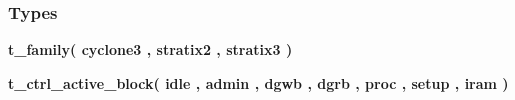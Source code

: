 \subsubsection*{Types}
 \begin{DoxyCompactItemize}
\item 
{\bfseries {\bf t\+\_\+family}{\bfseries \textcolor{vhdlchar}{(}\textcolor{vhdlchar}{ }\textcolor{vhdlchar}{cyclone3}\textcolor{vhdlchar}{ }\textcolor{vhdlchar}{,}\textcolor{vhdlchar}{ }\textcolor{vhdlchar}{stratix2}\textcolor{vhdlchar}{ }\textcolor{vhdlchar}{,}\textcolor{vhdlchar}{ }\textcolor{vhdlchar}{stratix3}\textcolor{vhdlchar}{ }\textcolor{vhdlchar}{)}\textcolor{vhdlchar}{ }}} 
\item 
{\bfseries {\bf t\+\_\+ctrl\+\_\+active\+\_\+block}{\bfseries \textcolor{vhdlchar}{(}\textcolor{vhdlchar}{ }\textcolor{vhdlchar}{idle}\textcolor{vhdlchar}{ }\textcolor{vhdlchar}{,}\textcolor{vhdlchar}{ }\textcolor{vhdlchar}{admin}\textcolor{vhdlchar}{ }\textcolor{vhdlchar}{,}\textcolor{vhdlchar}{ }\textcolor{vhdlchar}{dgwb}\textcolor{vhdlchar}{ }\textcolor{vhdlchar}{,}\textcolor{vhdlchar}{ }\textcolor{vhdlchar}{dgrb}\textcolor{vhdlchar}{ }\textcolor{vhdlchar}{,}\textcolor{vhdlchar}{ }\textcolor{vhdlchar}{proc}\textcolor{vhdlchar}{ }\textcolor{vhdlchar}{,}\textcolor{vhdlchar}{ }\textcolor{vhdlchar}{setup}\textcolor{vhdlchar}{ }\textcolor{vhdlchar}{,}\textcolor{vhdlchar}{ }\textcolor{vhdlchar}{iram}\textcolor{vhdlchar}{ }\textcolor{vhdlchar}{)}\textcolor{vhdlchar}{ }}} 
\item 

\end{DoxyCompactItemize}
